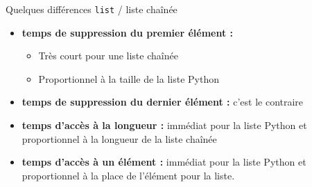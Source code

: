 \documentclass[10pt]{beamer}
\begin{document}
\begin{frame}[fragile]{Quelques différences \texttt{list} / liste chaînée}
\begin{itemize}
    \item \textbf{temps de suppression du premier élément :}  \begin{itemize}
        \item Très court pour une liste chaînée
        \item Proportionnel à la taille de la liste Python
    \end{itemize}
    \item \textbf{temps de suppression du dernier élément :}  c'est le contraire
    \item \textbf{temps d'accès à la longueur :} immédiat pour la liste Python et proportionnel à la longueur de la liste chaînée
    \item \textbf{temps d'accès à un élément :} immédiat pour la liste Python et proportionnel à la place de l'élément pour la liste.
\end{itemize}
\end{frame}
\end{document}
